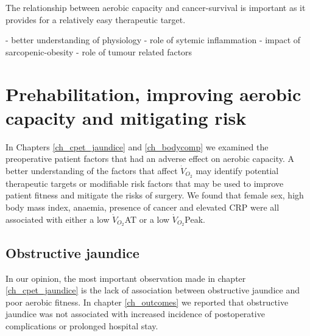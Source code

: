 The relationship between aerobic capacity and cancer-survival is important as it provides for a relatively easy therapeutic target.


- better understanding of physiology
- role of sytemic inflammation \parencite{van_heek_hospital_2005, ho_effect_2003, birkmeyer_surgeon_2003, halm_is_2002}
- impact of sarcopenic-obesity \parencite{joglekar_sarcopenia_2015, reisinger_sarcopenia_2015, gonzalez_obesity_2014}
- role of tumour related factors \parencite{williams_surgical_2014}


\section{Prehabilitation, improving aerobic capacity and mitigating risk}
In Chapters \ref{ch_cpet_jaundice} and \ref{ch_bodycomp} we examined the preoperative patient factors that had an adverse effect on aerobic capacity.
A better understanding of the factors that affect $\dot{V}_{O_2}$ may identify potential therapeutic targets or modifiable risk factors that may be used to improve patient fitness and mitigate the risks of surgery.
We found that female sex, high body mass index, anaemia, presence of cancer and elevated CRP were all associated with either a low $\dot{V}_{O_2}$AT or a low $\dot{V}_{O_2}$Peak.

\subsection{Obstructive jaundice}
In our opinion, the most important observation made in chapter \ref{ch_cpet_jaundice} is the lack of association between obstructive jaundice and poor aerobic fitness. 
In chapter \ref{ch_outcomes} we reported that obstructive jaundice was not associated with increased incidence of postoperative complications or prolonged hospital stay. 

